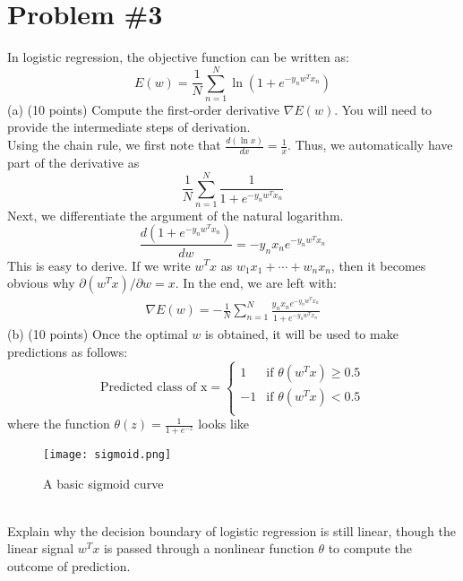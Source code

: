 \documentclass[12pt]{article}
\begin{document}
	\section*{Problem \#3}
	In logistic regression, the objective function can be written as:
	\begin{equation*}
	E(w)=\frac{1}{N} \sum_{n=1}^{N} \ln(1+e^{-y_nw^Tx_n})
	\end{equation*}
	(a) (10 points) Compute the first-order derivative $\nabla E(w)$. You will need to provide the intermediate steps of derivation.\\
	Using the chain rule, we first note that $\frac{d(\ln x)}{dx} = \frac{1}{x}$. Thus, we automatically have part of the derivative as
	\begin{equation*}
	\frac{1}{N} \sum_{n=1}^{N} \frac{1}{1+e^{-y_nw^Tx_n}}
	\end{equation*}
	Next, we differentiate the argument of the natural logarithm.
	\begin{equation*}
	\frac{d(1+e^{-y_nw^Tx_n})}{dw} = -y_n x_n e^{-y_nw^Tx_n}
	\end{equation*}
	This is easy to derive. If we write $w^T x$ as $w_1 x_1 + \cdots + w_n x_n$, then it becomes obvious why $\partial (w^T x) / \partial w = x$. In the end, we are left with:
	\begin{align*}
	\nabla E(w) = -\frac{1}{N} \sum_{n=1}^{N} \frac{y_n x_n e^{-y_nw^Tx_n}}{1+e^{-y_nw^Tx_n}}
	\end{align*}
	(b) (10 points) Once the optimal $w$ is obtained, it will be used to make predictions as follows:
	\begin{equation*}
	\text{Predicted class of x} = 
	\begin{cases}
	1 & \text{if } \theta(w^Tx) \ge 0.5 \\
	-1 & \text{if } \theta(w^Tx) < 0.5 \\
	\end{cases}
	\end{equation*}
	where the function $\theta(z) = \frac{1}{1+e^{-z}}$ looks like \\
	\begin{figure}[h]
		\begin{center}
			\texttt{[image: sigmoid.png]}
			\caption{A basic sigmoid curve}
			\label{fig:sigmoidEx}
		\end{center}
	\end{figure}
	\\ 
	Explain why the decision boundary of logistic regression is still linear, though the linear signal $w^Tx$ is passed through a nonlinear function $\theta$ to compute the outcome of prediction.
\end{document}

